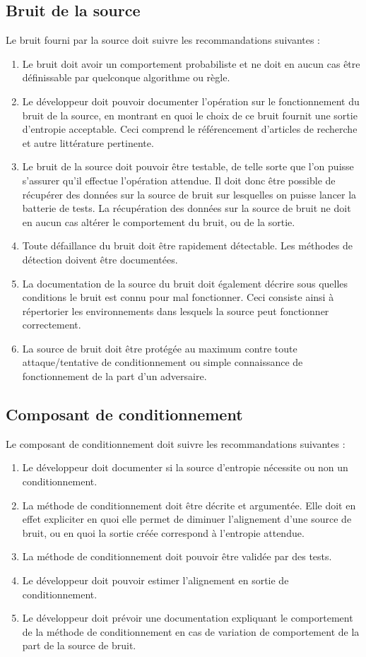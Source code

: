 \subsection{Bruit de la source}
Le bruit fourni par la source doit suivre les recommandations suivantes :
\begin{enumerate}
\item Le bruit doit avoir un comportement probabiliste et ne doit en aucun cas être définissable par quelconque algorithme ou règle.
\item Le développeur doit pouvoir documenter l'opération sur le fonctionnement du bruit de la source, en montrant en quoi le choix de ce bruit fournit une sortie d'entropie acceptable. Ceci comprend le référencement d'articles de recherche et autre littérature pertinente.
\item Le bruit de la source doit pouvoir être testable, de telle sorte que l'on puisse s'assurer qu'il effectue l'opération attendue. Il doit donc être possible de récupérer des données sur la source de bruit sur lesquelles on puisse lancer la batterie de tests. La récupération des données sur la source de bruit ne doit en aucun cas altérer le comportement du bruit, ou de la sortie.
\item Toute défaillance du bruit doit être rapidement détectable. Les méthodes de détection doivent être documentées.
\item La documentation de la source du bruit doit également décrire sous quelles conditions le bruit est connu pour mal fonctionner. Ceci consiste ainsi à répertorier les environnements dans lesquels la source peut fonctionner correctement. 
\item La source de bruit doit être protégée au maximum contre toute attaque/tentative de conditionnement ou simple connaissance de fonctionnement de la part d'un adversaire. 
\end{enumerate}

\subsection{Composant de conditionnement}
Le composant de conditionnement doit suivre les recommandations suivantes :
\begin{enumerate}
\item Le développeur doit documenter si la source d'entropie nécessite ou non un conditionnement. 
\item La méthode de conditionnement doit être décrite et argumentée. Elle doit en effet expliciter en quoi elle permet de diminuer l'alignement d'une source de bruit, ou en quoi la sortie créée correspond à l'entropie attendue.
\item La méthode de conditionnement doit pouvoir être validée par des tests.
\item Le développeur doit pouvoir estimer l'alignement en sortie de conditionnement. 
\item Le développeur doit prévoir une documentation expliquant le comportement de la méthode de conditionnement en cas de variation de comportement de la part de la source de bruit.
\end{enumerate}

